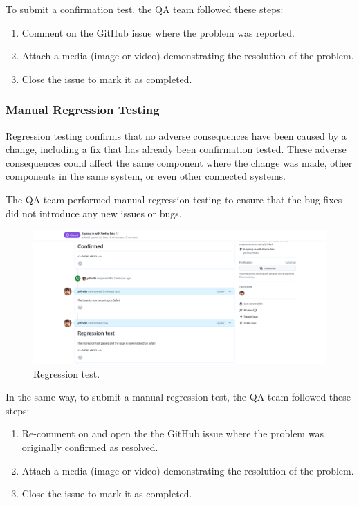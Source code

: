 To submit a confirmation test, the QA team followed these steps:

\begin{enumerate}
    \item Comment on the GitHub issue where the problem was reported.
    \item Attach a media (image or video) demonstrating the resolution of the problem.
    \item Close the issue to mark it as completed.
\end{enumerate}

\subsubsection{Manual Regression Testing}

Regression testing confirms that no adverse consequences have been caused by a change, including a fix that has already been confirmation tested. These adverse consequences could affect the same component where the change was made, other components in the same system, or even other connected systems. \cite{istqbctfl4.0.1}

The QA team performed manual regression testing to ensure that the bug fixes did not introduce any new issues or bugs.

\begin{figure}[H]
    \centering
    \includegraphics[width=\textwidth]{project/images/regression-test.png}
    \caption{Regression test.}
    \label{fig:regression-test}
\end{figure}

In the same way, to submit a manual regression test, the QA team followed these steps:

\begin{enumerate}
    \item Re-comment on and open the the GitHub issue where the problem was originally confirmed as resolved.
    \item Attach a media (image or video) demonstrating the resolution of the problem.
    \item Close the issue to mark it as completed.
\end{enumerate}
